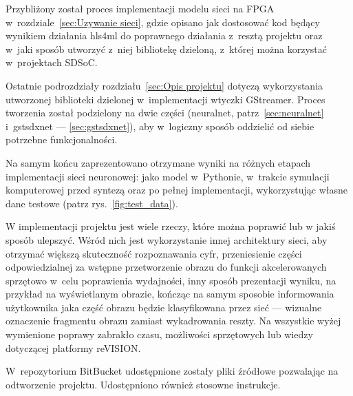 \documentclass[12pt, oneside, a4paper]{article}
\begin{document}
Przybliżony został proces implementacji modelu sieci na FPGA
w~rozdziale~\ref{sec:Uzywanie sieci}, gdzie opisano jak dostosować kod będący
wynikiem działania hls4ml do poprawnego działania z~resztą projektu
oraz w~jaki sposób utworzyć z~niej bibliotekę dzieloną, z~której można
korzystać w~projektach SDSoC.

Ostatnie podrozdziały rozdziału~\ref{sec:Opis projektu} dotyczą
wykorzystania utworzonej biblioteki dzielonej w~implementacji wtyczki
GStreamer. Proces tworzenia został podzielony na dwie części (neuralnet,
patrz~\ref{sec:neuralnet} i~gstsdxnet --- \ref{sec:gstsdxnet}), aby
w~logiczny sposób oddzielić od siebie potrzebne funkcjonalności.

Na samym końcu zaprezentowano otrzymane wyniki na różnych etapach
implementacji sieci neuronowej: jako model w~Pythonie, w~trakcie symulacji
komputerowej przed syntezą oraz po pełnej implementacji, wykorzystując
własne dane testowe (patrz rys.~\ref{fig:test_data}).

W implementacji projektu jest wiele rzeczy, które można poprawić lub
w jakiś sposób ulepszyć. Wśród nich jest wykorzystanie innej architektury
sieci, aby otrzymać większą skuteczność rozpoznawania cyfr, przeniesienie
części odpowiedzialnej za wstępne przetworzenie obrazu do funkcji
akcelerowanych sprzętowo w~celu poprawienia wydajności, inny sposób
prezentacji wyniku, na przykład na wyświetlanym obrazie, kończąc
na samym sposobie informowania użytkownika jaka część obrazu będzie
klasyfikowana przez sieć --- wizualne oznaczenie fragmentu obrazu zamiast
wykadrowania reszty. Na wszystkie wyżej
wymienione poprawy zabrakło czasu, możliwości
sprzętowych lub wiedzy dotyczącej platformy reVISION.

W~repozytorium BitBucket\cite{repozytorium} udostępnione zostały pliki źródłowe
pozwalając na odtworzenie projektu. Udostępniono również stosowne instrukcje.

\restoregeometry{}
\end{document}
